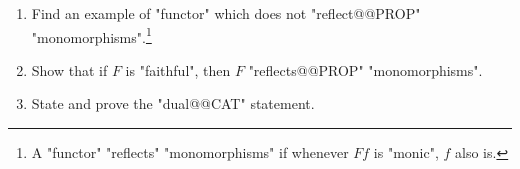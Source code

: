 \documentclass[main.tex]{subfiles}
\begin{document}
\begin{exer}\label{exer:duality:reflecting}
	\begin{enumerate}
		\item Find an example of "functor" which does not "reflect@@PROP" "monomorphisms".\footnote{A "functor" "reflects" "monomorphisms" if whenever $Ff$ is "monic", $f$ also is.}
		\item Show that if $F$ is "faithful", then $F$ "reflects@@PROP" "monomorphisms".
		\item State and prove the "dual@@CAT" statement.
	\end{enumerate}
\end{exer}

%
\end{document}
